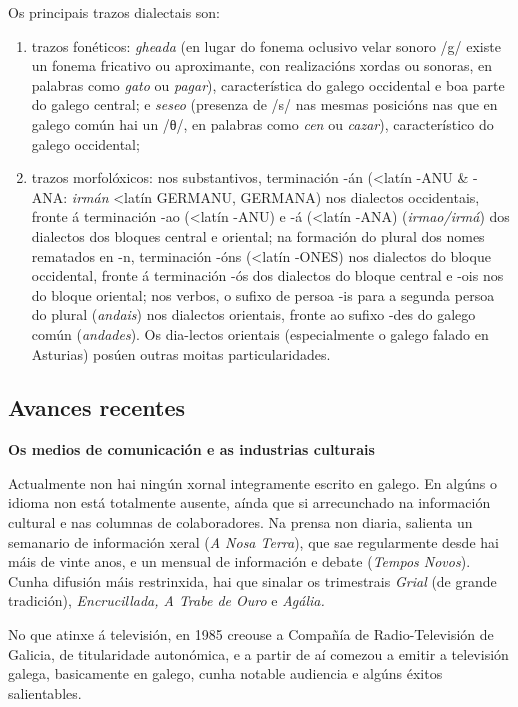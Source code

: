 \begin{multicols}{2}
Os principais trazos dialectais son:
	\begin{enumerate}
	   \item trazos fonéticos: \textit{gheada} (en lugar do fonema oclusivo velar sonoro /g/ existe un fonema fricativo ou aproximante, con realizacións xordas ou sonoras, en palabras como \textit{gato} ou \textit{pagar}), característica do galego occidental e boa parte do galego central; e \textit{seseo} (presenza de /s/ nas mesmas posicións nas que en galego común hai un /θ/, en palabras como \textit{cen} ou \textit{cazar}), característico do galego occidental; 
	   \item trazos morfolóxicos: nos substantivos, terminación -án (<latín -ANU \& -ANA: \textit{irmán} <latín GERMANU, GERMANA) nos dialectos occidentais, fronte á terminación -ao (<latín -ANU) e -á (<latín -ANA) (\textit{irmao/irmá}) dos dialectos dos bloques central e oriental; na formación do plural dos nomes rematados en -n, terminación -óns (<latín -ONES) nos dialectos do bloque occidental, fronte á terminación -ós dos dialectos do bloque central e -ois nos do bloque oriental; nos verbos, o sufixo de persoa -is para a segunda persoa do plural (\textit{andais}) nos dialectos orientais, fronte ao sufixo -des do galego común (\textit{andades}). Os dia-lectos orientais (especialmente o galego falado en Asturias) posúen outras moitas particularidades.
\end{enumerate}

\subsection{Avances recentes}

    \textbf{Os medios de comunicación e as industrias culturais}

Actualmente  non hai ningún xornal integramente escrito en galego. En algúns o idioma non está totalmente ausente, aínda que si arrecunchado na información cultural e nas columnas de colaboradores. Na prensa non diaria, salienta un semanario de información xeral (\textit{A Nosa Terra}), que sae regularmente desde hai máis de vinte anos, e un mensual de información e debate (\textit{Tempos Novos}). Cunha difusión máis restrinxida, hai que sinalar os trimestrais \textit{Grial} (de grande tradición), \textit{Encrucillada, A Trabe de Ouro} e \textit{Agália.}

No que atinxe á televisión, en 1985 creouse a Compañía de Radio-Televisión de Galicia, de titularidade autonómica, e a partir de aí comezou a emitir a televisión galega, basicamente en galego, cunha notable audiencia e algúns éxitos salientables. 


\end{multicols}
